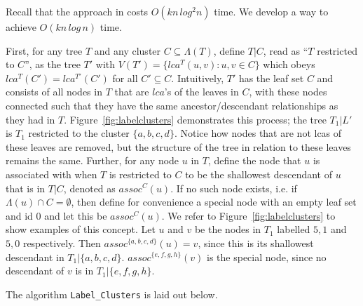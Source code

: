 \documentclass{article}
\newcommand{\leafset}{\Lambda}
\begin{document}
    Recall that the approach in \cite{gawrychowski2017faster} costs $O(kn\,log^2n)$ time. We develop a way to achieve $O(kn\,log\,n)$ time.

    First, for any tree $T$ and any cluster $C \subseteq \leafset(T)$, define $T|C$, read as ``$T$ restricted to $C$'', as the tree $T'$ with $V(T') = \{lca^T(u, v) : u, v \in C\}$ which obeys $lca^T(C') = lca^{T'}(C')$ for all $C' \subseteq C$. Intuitively, $T'$ has the leaf set $C$ and consists of all nodes in $T$ that are $lca$'s of the leaves in $C$, with these nodes connected such that they have the same ancestor/descendant relationships as they had in $T$. Figure~\ref{fig:labelclusters} demonstrates this process; the tree $T_1|L'$ is $T_1$ restricted to the cluster $\{a, b, c, d\}$. Notice how nodes that are not lcas of these leaves are removed, but the structure of the tree in relation to these leaves remains the same. Further, for any node $u$ in $T$, define the node that $u$ is associated with when $T$ is restricted to $C$ to be the shallowest descendant of $u$ that is in $T|C$, denoted as $assoc^{C}(u)$. If no such node exists, i.e. if $\leafset(u) \cap C = \emptyset$, then define for convenience a special node with an empty leaf set and id $0$ and let this be $assoc^{C}(u)$. We refer to Figure~\ref{fig:labelclusters} to show examples of this concept. Let $u$ and $v$ be the nodes in $T_1$ labelled $5, 1$ and $5, 0$ respectively. Then $assoc^{\{a, b, c, d\}}(u) = v$, since this is its shallowest descendant in $T_1|\{a, b, c, d\}$. $assoc^{\{e, f, g, h\}}(v)$ is the special node, since no descendant of $v$ is in $T_1|\{e, f, g, h\}$.

    The algorithm \texttt{Label\_Clusters} is laid out below.
\end{document}
